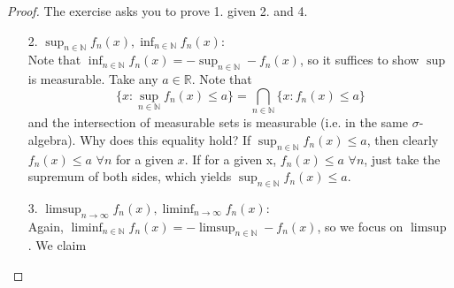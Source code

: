 \documentclass[11pt]{scrartcl}
\begin{document}
\begin{proof} The exercise asks you to prove 1. given 2. and 4.
\begin{itemize}
\item[2.] $\sup_{n\in \mathbb{N}} f_n(x), \inf_{n\in \mathbb{N}} f_n(x)$: \\
Note that $\inf_{n\in \mathbb{N}} f_n(x) = - \sup_{n\in \mathbb{N}}  - f_n(x)$, so it suffices to show $\sup$ is measurable. Take any $a \in \mathbb{R}$. Note that 
$$\{x: \sup_{n\in \mathbb{N}} f_n(x) \leq a\} = \bigcap_{n\in \mathbb{N}} \{x: f_n(x) \leq a\} $$
and the intersection of measurable sets is measurable (i.e. in the same $\sigma$-algebra). Why does this equality hold? If $\sup_{n\in \mathbb{N}} f_n(x) \leq a$, then clearly $f_n(x) \leq a$ $\forall n$ for a given $x$. If for a given x, $f_n(x) \leq a$ $\forall n$, just take the supremum of both sides, which yields $\sup_{n\in \mathbb{N}} f_n(x) \leq a$.
\item[3.] $\limsup_{n\rightarrow \infty} f_n(x), \liminf_{n\rightarrow \infty} f_n(x)$:\\
Again, $\liminf_{n\in \mathbb{N}} f_n(x) = - \limsup_{n\in \mathbb{N}}  - f_n(x)$, so we focus on $\limsup$. We claim


\end{itemize}
\end{proof}
\end{document}
